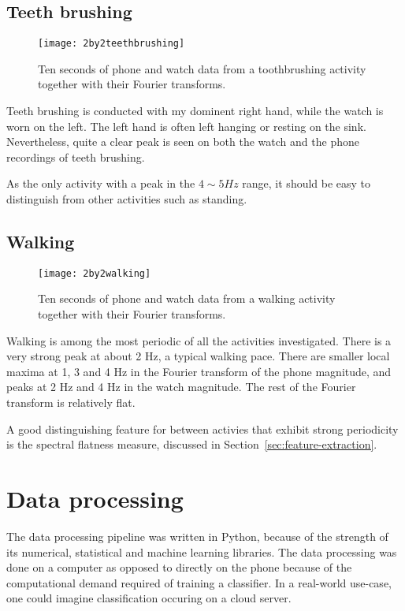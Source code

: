    \subsection{Teeth brushing}
      \begin{figure}[!th]
        \centering
        \texttt{[image: 2by2teethbrushing]}
        \caption{Ten seconds of phone and watch data from a toothbrushing activity together with their Fourier transforms.}
        \label{fig:2by2teethbrushing}
      \end{figure}
      
      Teeth brushing is conducted with my dominent right hand, while the watch is worn on the left. The left hand is often left hanging or resting on the sink. Nevertheless, quite a clear peak is seen on both the watch and the phone recordings of teeth brushing.
      
      As the only activity with a peak in the $4 \sim 5 \si{Hz}$ range, it should be easy to distinguish from other activities such as standing.
    \subsection{Walking}
      \begin{figure}[!th]
        \centering
        \texttt{[image: 2by2walking]}
        \caption{Ten seconds of phone and watch data from a walking activity together with their Fourier transforms.}
        \label{fig:2by2walking}
      \end{figure}
      
      Walking is among the most periodic of all the activities investigated. There is a very strong peak at about 2 Hz, a typical walking pace. There are smaller local maxima at 1, 3 and 4 Hz in the Fourier transform of the phone magnitude, and peaks at 2 Hz and 4 Hz in the watch magnitude. The rest of the Fourier transform is relatively flat.
      
      A good distinguishing feature for between activies that exhibit strong periodicity is the spectral flatness measure, discussed in Section~\ref{sec:feature-extraction}.

  \section{Data processing}
    \label{sec:data-processing}
    The data processing pipeline was written in Python, because of the strength of its numerical, statistical and machine learning libraries. The data processing was done on a computer as opposed to directly on the phone because of the computational demand required of training a classifier. In a real-world use-case, one could imagine classification occuring on a cloud server.
